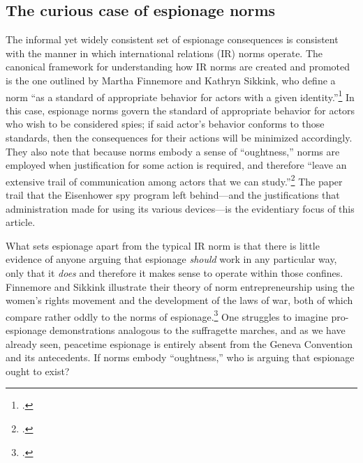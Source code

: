 \documentclass[12pt]{extarticle}
\begin{document}

\subsection{The curious case of espionage norms}
The informal yet widely consistent set of espionage consequences is consistent with the manner in which international relations (IR) norms operate. The canonical framework for understanding how IR norms are created and promoted is the one outlined by Martha Finnemore and Kathryn Sikkink, who define a norm \enquote{as a standard of appropriate behavior for actors with a given identity.}\footcite[891]{finnemore_international_1998} In this case, espionage norms govern the standard of appropriate behavior for actors who wish to be considered spies; if said actor's behavior conforms to those standards, then the consequences for their actions will be minimized accordingly. They also note that because norms embody a sense of \enquote{oughtness,} norms are employed when justification for some action is required, and therefore \enquote{leave an extensive trail of communication among actors that we can study.}\footcite[892]{finnemore_international_1998} The paper trail that the Eisenhower spy program left behind---and the justifications that administration made for using its various devices---is the evidentiary focus of this article.

What sets espionage apart from the typical IR norm is that there is little evidence of anyone arguing that espionage \emph{should} work in any particular way, only that it \emph{does} and therefore it makes sense to operate within those confines. Finnemore and Sikkink illustrate their theory of norm entrepreneurship using the women's rights movement and the development of the laws of war, both of which compare rather oddly to the norms of espionage.\footcite[894]{finnemore_international_1998} One struggles to imagine pro-espionage demonstrations analogous to the suffragette marches, and as we have already seen, peacetime espionage is entirely absent from the Geneva Convention and its antecedents. If norms embody \enquote{oughtness,} who is arguing that espionage ought to exist?
\end{document}
